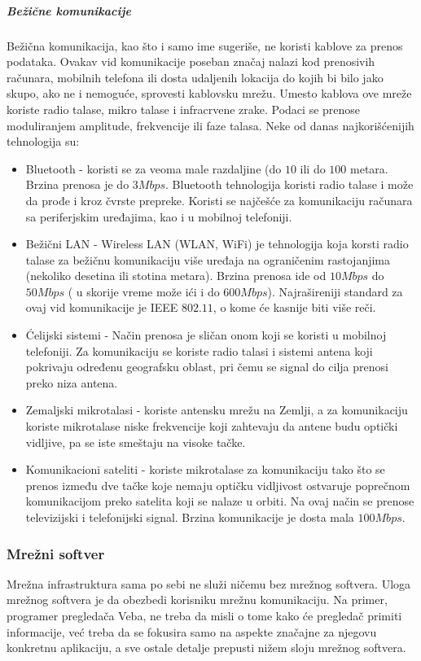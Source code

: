 \documentclass[a4paper]{article}
\begin{document}
\subparagraph{Bežične komunikacije}
Bežična komunikacija, kao što i samo ime sugeriše, ne koristi kablove za prenos podataka. Ovakav vid komunikacije poseban značaj nalazi kod prenosivih računara, mobilnih telefona ili dosta udaljenih lokacija do kojih bi bilo jako skupo, ako ne i nemoguće, sprovesti kablovsku mrežu. Umesto kablova ove mreže koriste radio talase, mikro talase i infracrvene zrake. Podaci se prenose moduliranjem amplitude, frekvencije ili faze talasa. Neke od danas najkorišćenijih tehnologija su: 
\begin{itemize}
\item Bluetooth - koristi se za veoma male razdaljine (do $10$ ili do $100$ metara. Brzina prenosa je do $3Mbps$. Bluetooth tehnologija koristi radio talase i može da prođe i kroz čvrste prepreke. Koristi se najčešće za komunikaciju računara sa periferjskim uređajima, kao i u mobilnoj telefoniji.
\item Bežični LAN - Wireless LAN (WLAN, WiFi) je tehnologija koja korsti radio talase za bežičnu komunikaciju više uređaja na ograničenim rastojanjima (nekoliko desetina ili stotina metara). Brzina prenosa ide od $10Mbps$ do $50Mbps$ ( u skorije vreme može ići i do $600Mbps$). Najrašireniji standard za ovaj vid komunikacije je IEEE $802.11$, o kome će kasnije biti više reči. 
\item Ćelijski sistemi - Način prenosa je sličan onom koji se koristi u mobilnoj telefoniji. Za komunikaciju se koriste radio talasi i sistemi antena koji pokrivaju određenu geografsku oblast, pri čemu se signal do cilja prenosi preko niza antena. 
\item Zemaljski mikrotalasi - koriste antensku mrežu na Zemlji, a za komunikaciju koriste mikrotalase niske frekvencije koji zahtevaju da antene budu optički vidljive, pa se iste smeštaju na visoke tačke. 
\item Komunikacioni sateliti - koriste mikrotalase za komunikaciju tako što se prenos između dve tačke koje nemaju optičku vidljivost ostvaruje poprečnom komunikacijom preko satelita koji se nalaze u orbiti. Na ovaj način se prenose televizijski i telefonijski signal. Brzina komunikacije je dosta mala $100Mbps$.
\end{itemize}

\subsubsection{Mrežni softver}
Mrežna infrastruktura sama po sebi ne služi ničemu bez mrežnog softvera. Uloga mrežnog softvera je da obezbedi korisniku mrežnu komunikaciju. Na primer, programer pregledača Veba, ne treba da misli o tome kako će pregledač primiti informacije, već treba da se fokusira samo na aspekte značajne za njegovu konkretnu aplikaciju, a sve ostale detalje prepusti nižem sloju mrežnog softvera.
\end{document}
